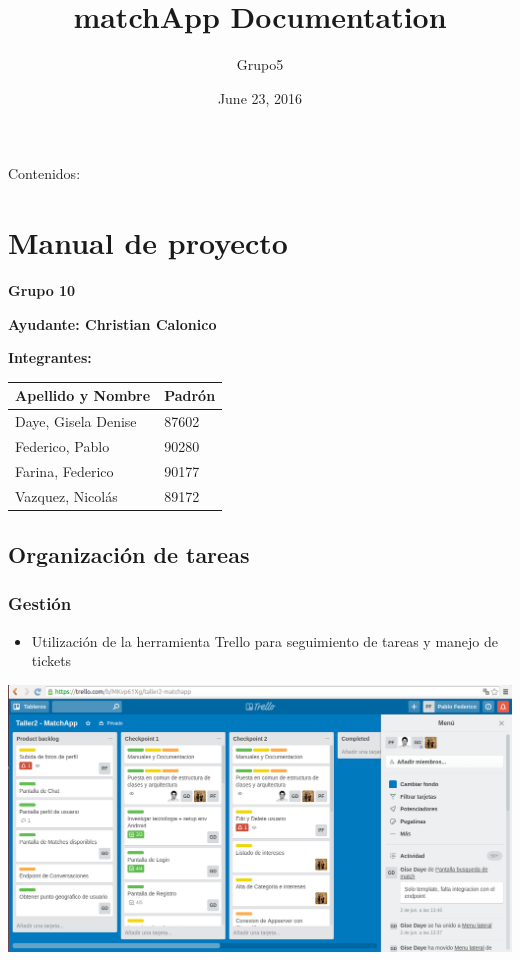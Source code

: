 \documentclass[letterpaper,10pt,english]{sphinxmanual}
\title{matchApp Documentation}
\date{June 23, 2016}
\author{Grupo5}
\begin{document}
\maketitle
\tableofcontents
{}\label{index::doc}


Contenidos:


\chapter{Manual de proyecto}
\label{manuals:manual-de-proyecto}\label{manuals::doc}\label{manuals:documentacion-de-matchapp}
\textbf{Grupo 10}

\textbf{Ayudante: Christian Calonico}

\textbf{Integrantes:}

\begin{tabulary}{\linewidth}{|L|L|}
\hline
\textsf{\relax 
Apellido y Nombre
} & \textsf{\relax 
Padrón
}\\
\hline
Daye, Gisela Denise
 & 
87602
\\
\hline
Federico, Pablo
 & 
90280
\\
\hline
Farina, Federico
 & 
90177
\\
\hline
Vazquez, Nicolás
 & 
89172
\\
\hline\end{tabulary}



\section{Organización de tareas}
\label{manuals:organizacion-de-tareas}

\subsection{Gestión}
\label{manuals:gestion}\begin{itemize}
\item {} 
Utilización de la herramienta Trello para seguimiento de tareas y manejo de tickets

\end{itemize}

\includegraphics{trello.png}
\end{document}
